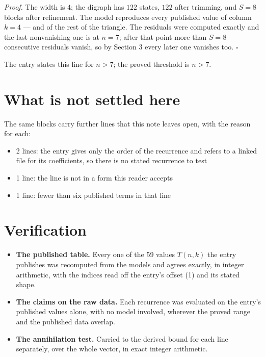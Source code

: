 \documentclass[11pt]{article}
\theoremstyle{definition}
\begin{document}
{\itshape Proof.} The width is $4$; the digraph has $122$ states, $122$ after trimming, and $S = 8$ blocks after refinement. The model reproduces every published value of column $k = 4$ --- and of the rest of the triangle. The residuals were computed exactly and the last nonvanishing one is at $n = 7$; after that point more than $S = 8$ consecutive residuals vanish, so by Section 3 every later one vanishes too. $\square$

The entry states this line for $n > 7$; the proved threshold is $n > 7$.

\section{What is not settled here}

The same blocks carry further lines that this note leaves open, with the reason for each:

\begin{itemize}

\item 2 lines: the entry gives only the order of the recurrence and refers to a linked file for its coefficients, so there is no stated recurrence to test

\item 1 line: the line is not in a form this reader accepts

\item 1 line: fewer than six published terms in that line

\end{itemize}

\section{Verification}

\begin{itemize}

\item {\bfseries The published table.} Every one of the 59 values $T(n,k)$ the entry publishes was recomputed from the models and agrees exactly, in integer arithmetic, with the indices read off the entry's offset (1) and its stated shape.

\item {\bfseries The claims on the raw data.} Each recurrence was evaluated on the entry's published values alone, with no model involved, wherever the proved range and the published data overlap.

\item {\bfseries The annihilation test.} Carried to the derived bound for each line separately, over the whole vector, in exact integer arithmetic.

\end{itemize}
\end{document}
